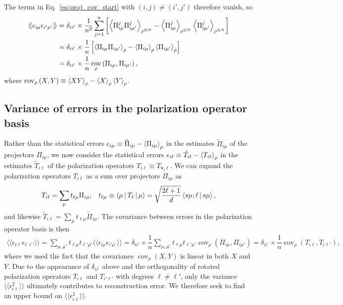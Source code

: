 \documentclass[notitlepage,twocolumn]{revtex4-2}
\newcommand{\f}[2]{\dfrac{#1}{#2}} %
\newcommand{\p}[1]{\left(#1\right)} %
\renewcommand{\sp}[1]{\left[#1\right]} %
\newcommand{\bk}{\Braket} %
\renewcommand{\v}{\bm} %
\newcommand{\bbk}[1]{\langle\!\langle #1 \rangle\!\rangle}
\DeclareMathOperator{\cov}{cov}
\begin{document}
The terms in Eq.~\eqref{eq:proj_cov_start} with $\p{i,j}\ne\p{i',j'}$ therefore vanish, so
\begin{align}
  \bbk{\epsilon_{i\mu} \epsilon_{i'\mu'}}
  &= \delta_{ii'} \times \f1{n^2} \sum_{j=1}^n \sp{\bk{\Pi_{i\mu}^j \Pi_{i\mu'}^j}_{\rho^{\otimes N}}
    - \bk{\Pi_{i\mu}^j}_{\rho^{\otimes N}}
    \bk{\Pi_{i\mu'}^j}_{\rho^{\otimes N}}} \\
  &= \delta_{ii'} \times \f1n \sp{\bk{\Pi_{i\mu} \Pi_{i\mu'}}_\rho
    - \bk{\Pi_{i\mu}}_\rho \bk{\Pi_{i\mu'}}_\rho} \\
  &= \delta_{ii'} \times \f1n \cov_\rho\p{\Pi_{i\mu}, \Pi_{i\mu'}},
\end{align}
where $\cov_\rho\p{X,Y} \equiv \bk{XY}_\rho - \bk{X}_\rho \bk{Y}_\rho$.

\subsection{Variance of errors in the polarization operator basis}

Rather than the statistical errors $\epsilon_{i\mu} \equiv \tilde\Pi_{i\mu} - \bk{\Pi_{i\mu}}_\rho$ in the estimates $\tilde\Pi_{i\mu}$ of the projectors $\Pi_{i\mu}$, we now consider the statistical errors $\epsilon_{i\ell} \equiv \tilde T_{i\ell} - \bk{T_{i\ell}}_\rho$ in the estimates $\tilde T_{i\ell}$ of the polarization operators $T_{i\ell} \equiv T_{\v v_i\ell}$.
We can expand the polarization operators $T_{i\ell}$ as a sum over projectors $\Pi_{i\mu}$ as
\begin{align}
  T_{i\ell} = \sum_\mu t_{\ell\mu} \Pi_{i\mu},
  &&
  t_{\ell\mu} \equiv \bk{\mu|T_\ell|\mu}
  = \sqrt{\f{2\ell+1}{d}} \bk{s\mu;\ell|s\mu},
\end{align}
and likewise $\tilde T_{i\ell} = \sum_\mu t_{\ell\mu} \tilde\Pi_{i\mu}$.
The covariance between errors in the polarization operator basis is then
\begin{align}
  \bbk{\epsilon_{i\ell} \epsilon_{i'\ell'}}
  = \sum_{\mu,\mu'} t_{\ell\mu} t_{\ell'\mu'}
  \bbk{\epsilon_{i\mu} \epsilon_{i'\mu'}}
  = \delta_{ii'} \times \f1n
  \sum_{\mu,\mu'} t_{\ell\mu} t_{\ell'\mu'}
  \cov_\rho\p{\Pi_{i\mu}, \Pi_{i\mu'}}
  = \delta_{ii'} \times \f1n \cov_\rho\p{T_{i\ell}, T_{i\ell'}},
\end{align}
where we used the fact that the covariance $\cov_\rho\p{X,Y}$ is linear in both $X$ and $Y$.
Due to the appearance of $\delta_{ii'}$ above and the orthogonality of rotated polarization operators $T_{i\ell}$ and $T_{i'\ell'}$ with degrees $\ell\ne\ell'$, only the variance $\bbk{\epsilon_{i\ell}^2}$ ultimately contributes to reconstruction error.
We therefore seek to find an upper bound on $\bbk{\epsilon_{i\ell}^2}$.
\end{document}
